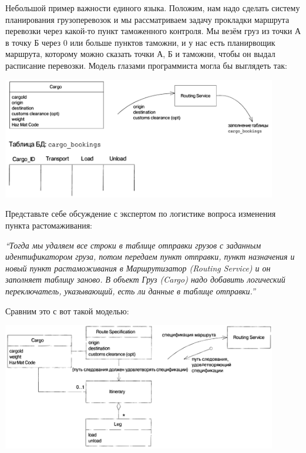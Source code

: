 \documentclass[a5paper]{article}
\begin{document}
Небольшой пример важности единого языка. Положим, нам надо сделать систему планирования грузоперевозок и мы рассматриваем задачу прокладки маршрута перевозки через какой-то пункт таможенного контроля. Мы везём груз из точки А в точку Б через 0 или больше пунктов таможни, и у нас есть планирвощик маршрута, которому можно сказать точки А, Б и таможни, чтобы он выдал расписание перевозки. Модель глазами программиста могла бы выглядеть так:

\begin{center}
    \includegraphics[width=0.9\textwidth]{lowAbstractionLanguage.png}
\end{center}

Представьте себе обсуждение с экспертом по логистике вопроса изменения пункта растомаживания:

\textit{``Тогда мы удаляем все строки в таблице отправки грузов с задан­ным идентификатором груза, потом передаем пункт отправки, пункт назначения и новый пункт растаможивания в Маршрутизатор (Routing Service) и он заполняет таблицу заново. В объект Груз (Cargo) надо добавить логический переключатель, указывающий, есть ли данные в таблице отправки.''}

Сравним это с вот такой моделью:

\begin{center}
    \includegraphics[width=0.9\textwidth]{highAbstractionLanguage.png}
\end{center}
\end{document}
